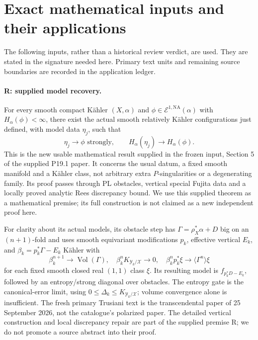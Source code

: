 \documentclass[11pt]{article}
\newcommand{\NA}{\mathrm{NA}}
\newcommand{\Vol}{\operatorname{Vol}}
\newcommand{\cE}{\mathcal E}
\theoremstyle{remark}\newtheorem{remark}[theorem]{Remark}
\begin{document}
\section{Exact mathematical inputs and their applications}\label{sec:inputs}
The following inputs, rather than a historical review verdict, are used.
They are stated in the signature needed here. Primary text units and
remaining source boundaries are recorded in the application ledger.

\paragraph{R: supplied model recovery.}
For every smooth compact K\"ahler $(X,\alpha)$ and
$\phi\in\cE^{1,\NA}(\alpha)$ with $H_\alpha(\phi)<\infty$, there
exist the actual smooth relatively K\"ahler configurations just
defined, with model data $\eta_j$, such that
\begin{equation}\label{eq:R}
 \eta_j\longrightarrow\phi\text{ strongly},\qquad
 H_\alpha(\eta_j)\longrightarrow H_\alpha(\phi).
\end{equation}
This is the new usable mathematical result supplied in the frozen
input, Section 5 of the supplied P19.1 paper. It concerns the usual
datum, a fixed smooth manifold and a K\"ahler class, not arbitrary
extra $P$-singularities or a degenerating family. Its proof passes
through PL obstacles, vertical special Fujita data and a locally
proved analytic Rees discrepancy bound. We use this supplied theorem
as a mathematical premise; its full construction is not claimed as a
new independent proof here.

For clarity about its actual models, its obstacle step has
$\Gamma=\rho_X^*\alpha+D$ big on an $(n+1)$-fold and uses smooth
equivariant modifications $p_k$, effective vertical $E_k$, and
$\beta_k=p_k^*\Gamma-E_k$ K\"ahler with
\[
 \beta_k^{n+1}\to\Vol(\Gamma),\quad
 \beta_k^nK_{\mathcal Y_k/\mathcal X}\to0,\quad
 \beta_k^np_k^*\xi\to\langle\Gamma^n\rangle\xi
\]
for each fixed smooth closed real $(1,1)$ class $\xi$.
Its resulting model is $f_{p_k^*D-E_k}$, followed by an entropy/strong
diagonal over obstacles. The entropy gate is the canonical-error
limit, using $0\leq\Delta_k\leq K_{\mathcal Y_k/\mathcal X}$;
volume convergence alone is insufficient. The fresh primary
Trusiani text \cite{T} is the transcendental paper of 25 September
2026, not the catalogue's polarized paper. The detailed vertical
construction and local discrepancy repair are part of the supplied
premise R; we do not promote a source abstract into their proof.
\end{document}
